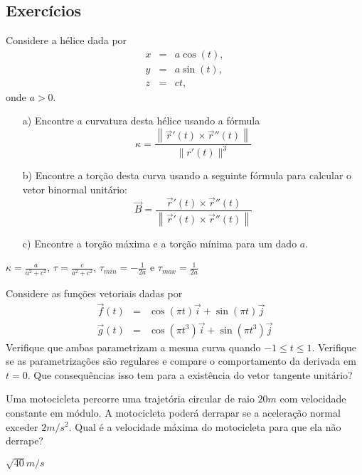 \construirExeresol


\subsection*{Exercícios}
\begin{exer} Considere a hélice dada por
\begin{eqnarray*}
x&=&a\cos(t),\\
y&=&a\sin(t),\\
z&=&ct,
\end{eqnarray*}
onde $a>0$.
\begin{itemize}
\item[a)] Encontre  a curvatura desta hélice usando a fórmula
$$\kappa=\frac{\left\|\vec{r}'(t)\times \vec{r}''(t)\right\|}{\|r'(t)\|^3}$$
\item[b)] Encontre a torção desta curva usando a seguinte fórmula para calcular o vetor binormal unitário: $$\vec{B}=\frac{\vec{r}'(t)\times \vec{r}''(t)}{\left\|\vec{r}'(t)\times \vec{r}''(t)\right\|}$$
\item[c)] Encontre a torção máxima e a torção mínima para um dado $a$. 
\end{itemize}
\end{exer}
\begin{resp}
 $\kappa= \frac{a}{a^2+c^2}$, $\tau = \frac{c}{a^2+c^2}$, $\tau_{min} = -\frac{1}{2a}$ e $\tau_{max} = \frac{1}{2a}$ 
\end{resp}


\begin{exer}
Considere as funções vetoriais dadas por
\begin{eqnarray*}
\vec{f}(t)&=&\cos(\pi t)\vec{i}+\sin(\pi t)\vec{j}\\
\vec{g}(t)&=&\cos(\pi t^3)\vec{i}+\sin(\pi t^3)\vec{j}
\end{eqnarray*}
Verifique que ambas parametrizam a mesma curva quando $-1\leq t \leq 1$. Verifique se as parametrizações são regulares e compare o comportamento da derivada em $t=0$. Que consequências isso tem para a existência do vetor tangente unitário? 
\end{exer}


\begin{exer}Uma motocicleta percorre uma trajetória circular de raio $20m$ com velocidade constante em módulo. A motocicleta poderá derrapar se a aceleração normal exceder $2m/s^2$. Qual é a velocidade máxima do motocicleta para que ela não derrape?
\end{exer}
\begin{resp}
 $\sqrt{40}m/s$
\end{resp}


